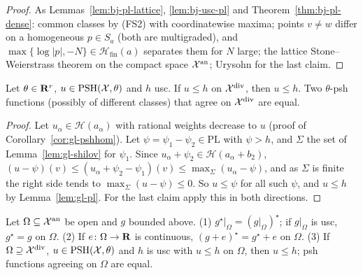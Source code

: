 \begin{proof}
As Lemmas~\ref{lem:bj-pl-lattice}, \ref{lem:bj-usc-pl} and Theorem~\ref{thm:bj-pl-dense}: common classes by (FS2) with coordinatewise maxima; points
$v\ne w$ differ on a homogeneous $p\in S_a$ (both are multigraded), and $\max\{\log|p|,-N\}\in\mathcal H_{\mathrm{fin}}(a)$ separates them for $N$ large; the
lattice Stone--Weierstrass theorem on the compact space $\mathcal X^{\mathrm{an}}$; Urysohn for the last claim.
\end{proof}

\begin{theorem}\label{thm:gl-comparison}
\leanok
{}
Let $\theta\in\mathbf{R}^r$, $u\in\operatorname{PSH}(\mathcal X,\theta)$ and $h$ usc. If $u\le h$ on $\mathcal X^{\mathrm{div}}$, then $u\le h$. Two $\theta$-psh functions (possibly of
different classes) that agree on $\mathcal X^{\mathrm{div}}$ are equal.
\end{theorem}

\begin{proof}
Let $u_\alpha\in\mathcal H(a_\alpha)$ with rational weights decrease to $u$ (proof of Corollary~\ref{cor:gl-pshhom}). Let $\psi=\psi_1-\psi_2\in\mathrm{PL}$ with
$\psi>h$, and $\Sigma$ the set of Lemma~\ref{lem:gl-shilov} for $\psi_1$. Since $u_\alpha+\psi_2\in\mathcal H(a_\alpha+b_2)$,
$(u-\psi)(v)\le(u_\alpha+\psi_2-\psi_1)(v)\le\max_\Sigma(u_\alpha-\psi)$, and as $\Sigma$ is finite the right side tends to $\max_\Sigma(u-\psi)\le0$. So $u\le\psi$ for all
such $\psi$, and $u\le h$ by Lemma~\ref{lem:gl-pl}. For the last claim apply this in both directions.
\end{proof}

\begin{lemma}\label{lem:gl-usc-local}
\leanok
{}
Let $\Omega\subseteq\mathcal X^{\mathrm{an}}$ be open and $g$ bounded above. (1) $g^\star|_\Omega=(g|_\Omega)^\star$; if $g|_\Omega$ is usc, $g^\star=g$ on $\Omega$. (2) If
$e\colon\Omega\to\mathbf{R}$ is continuous, $(g+e)^\star=g^\star+e$ on $\Omega$. (3) If $\Omega\supseteq\mathcal X^{\mathrm{div}}$, $u\in\operatorname{PSH}(\mathcal X,\theta)$ and $h$ is usc
with $u\le h$ on $\Omega$, then $u\le h$; psh functions agreeing on $\Omega$ are equal.
\end{lemma}

